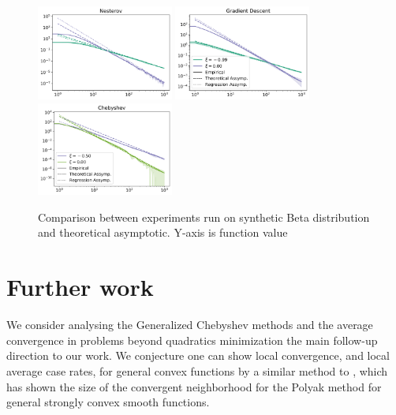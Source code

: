\documentclass{article}
\begin{document}
\begin{figure}[H]
    \centering
    \includegraphics[width= 0.4\textwidth]{new_imgs/nesterov.png}
    \includegraphics[width= 0.4\textwidth]{new_imgs/GD.png}\\
        \includegraphics[width= 0.4\textwidth]{new_imgs/chebyshev.png}

    \caption{Comparison between experiments run on synthetic Beta distribution and theoretical asymptotic. Y-axis is function value }
    \label{fig: last figure}
\end{figure}




\section{Further work}


We consider analysing the Generalized Chebyshev methods and the average convergence in problems beyond quadratics minimization the main follow-up direction to our work. We conjecture one can show local convergence, and local average case rates, for general convex functions by a similar method to \cite{wang2021modular}, which has shown the size of the convergent neighborhood for the Polyak method for general strongly convex smooth functions.
\newpage


\end{document}

